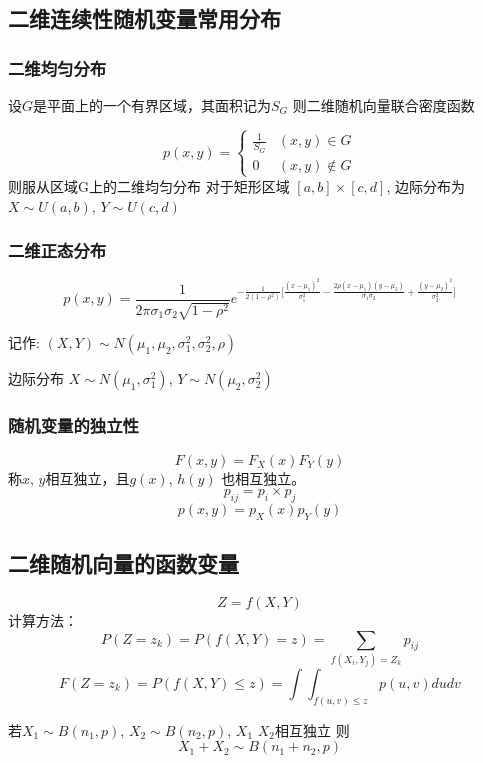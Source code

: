 \documentclass[10pt, a4paper]{article}
\begin{document}
    \subsection{二维连续性随机变量常用分布}
        \subsubsection{二维均匀分布}
            设$G$是平面上的一个有界区域，其面积记为$S_G$ 则二维随机向量联合密度函数

            $$p(x,y) = \begin{cases}
                \frac{1}{S_G} & (x, y) \in G \\
                0 & (x, y) \notin G 
            \end{cases}$$
            则服从区域G上的二维均匀分布
            对于矩形区域 $[a, b] \times [c, d]$, 边际分布为 $X \sim U(a, b)$, $Y \sim U(c,d)$

        \subsubsection{二维正态分布}
            $$
                p(x, y) = \frac{1}{2\pi\sigma_1\sigma_2\sqrt{1 - \rho^2}}e^{-\frac{1}{2(1 - \rho^2)}\lbrack\frac{(x - \mu_1)^2}{\sigma_1^2} - \frac{2\rho(x - \mu_1)(y - \mu_2)}{\sigma_1\sigma_2} + \frac{(y - \mu_2)^2}{\sigma_2^2}\rbrack}
            $$

            记作: $(X, Y) \sim N(\mu_1, \mu_2, \sigma_1^2, \sigma_2^2, \rho)$

            边际分布 $X \sim N(\mu_1, \sigma_1^2)$, $Y \sim N(\mu_2, \sigma_2^2)$
    \subsubsection{随机变量的独立性}
            $$F(x, y) = F_X(x)F_Y(y)$$ 
            称$x$, $y$相互独立，且$g(x)$, $h(y)$ 也相互独立。 
            $$p_{ij} = p_i \times p_j$$
            $$p(x, y) = p_X(x)p_Y(y)$$
            
    \subsection{二维随机向量的函数变量}
    $$Z = f(X, Y)$$
    计算方法：
    $$P(Z = z_k) = P(f(X, Y) = z) = \sum_{f(X_i, Y_j) = Z_k}p_{ij}$$
    $$F(Z = z_k) = P(f(X, Y) \leqslant z) = \int\int_{f(u, v) \leqslant z}p(u, v)dudv$$

    若$X_1 \sim B(n_1, p)$, $X_2 \sim B(n_2, p)$, $X_1$ $X_2$相互独立 则
    $$X_1 + X_2 \sim B(n_1 + n_2, p)$$
\end{document}

